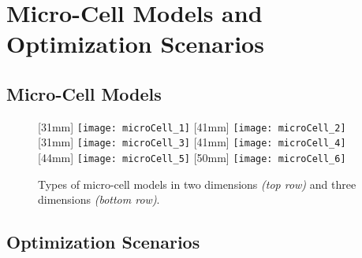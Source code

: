 \section{Micro-Cell Models and Optimization Scenarios}
\label{sec:63models}

\dummytext[5]{}

\subsection{Micro-Cell Models}
\label{sec:631models}

\dummytext[5]{}


\begin{figure}
  [31mm]{%
    \texttt{[image: microCell\_1]}%
  }%
  \hfill%
  [41mm]{%
    \texttt{[image: microCell\_2]}%
  }%
  \hfill%
  [31mm]{%
    \texttt{[image: microCell\_3]}%
  }%
  \hfill%
  [41mm]{%
    \texttt{[image: microCell\_4]}%
  }\\[2mm]%
  [44mm]{%
    \texttt{[image: microCell\_5]}%
  }%
  \qquad%
  [50mm]{%
    \texttt{[image: microCell\_6]}%
  }%
  \caption[Types of micro-cell models]{%
    Types of micro-cell models in two dimensions \emph{(top row)}
    and three dimensions \emph{(bottom row)}.%
  }%
  \label{fig:microCell}%
\end{figure}

\subsection{Optimization Scenarios}
\label{sec:632scenarios}

\dummytext[5]{}
